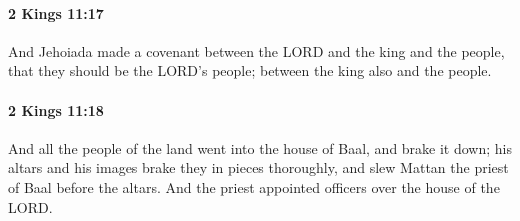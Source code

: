 		\paragraph{2 Kings 11:17} %
			\label{2KINGS-11-17}

			And Jehoiada made a covenant between the LORD and the king and the people, that they should be the LORD’s people; between the king also and the people.


		\paragraph{2 Kings 11:18} %
			\label{2KINGS-11-18}

			And all the people of the land went into the house of Baal, and brake it down; his altars and his images brake they in pieces thoroughly, and slew Mattan the priest of Baal before the altars. And the priest appointed officers over the house of the LORD.

